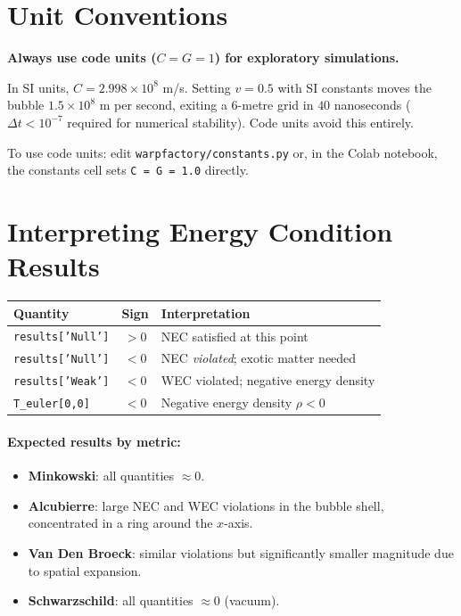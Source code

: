 \documentclass[11pt, a4paper, twoside]{report}
\begin{document}
\section{Unit Conventions}

\begin{infobox}
\textbf{Always use code units ($C=G=1$) for exploratory simulations.}

In SI units, $C = 2.998 \times 10^8$ m/s.  Setting $v = 0.5$ with SI
constants moves the bubble $1.5 \times 10^8$ m per second, exiting a
6-metre grid in $40$ nanoseconds ($\Delta t < 10^{-7}$ required for
numerical stability).  Code units avoid this entirely.
\end{infobox}

To use code units: edit \texttt{warpfactory/constants.py} or, in the
Colab notebook, the constants cell sets \texttt{C = G = 1.0} directly.

\section{Interpreting Energy Condition Results}

\begin{center}
\begin{tabularx}{\linewidth}{lcX}
  \toprule
  Quantity & Sign & Interpretation \\
  \midrule
  \texttt{results['Null']} & $>0$ & NEC satisfied at this point \\
  \texttt{results['Null']} & $<0$ & NEC \emph{violated}; exotic matter needed \\
  \texttt{results['Weak']} & $<0$ & WEC violated; negative energy density \\
  \texttt{T\_euler[0,0]}  & $<0$ & Negative energy density $\rho < 0$ \\
  \bottomrule
\end{tabularx}
\end{center}

\paragraph{Expected results by metric:}
\begin{itemize}
  \item \textbf{Minkowski}: all quantities $\approx 0$.
  \item \textbf{Alcubierre}: large NEC and WEC violations in the bubble
        shell, concentrated in a ring around the $x$-axis.
  \item \textbf{Van Den Broeck}: similar violations but significantly
        smaller magnitude due to spatial expansion.
  \item \textbf{Schwarzschild}: all quantities $\approx 0$ (vacuum).
\end{itemize}
\end{document}
